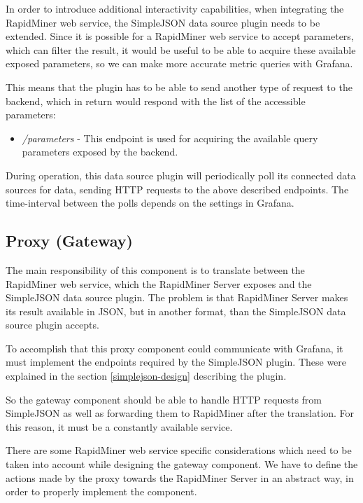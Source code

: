 In order to introduce additional interactivity capabilities, when integrating the RapidMiner web service, the SimpleJSON data source plugin needs to be extended. Since it is possible for a RapidMiner web service to accept parameters, which can filter the result, it would be useful to be able to acquire these available exposed parameters, so we can make more accurate metric queries with Grafana.

This means that the plugin has to be able to send another type of request to the backend, which in return would respond with the list of the accessible parameters:

\begin{itemize}
	\item \emph{/parameters} - This endpoint is used for acquiring the available query parameters exposed by the backend.
\end{itemize}

During operation, this data source plugin will periodically poll its connected data sources for data, sending HTTP requests to the above described endpoints. The time-interval between the polls depends on the settings in Grafana.

\subsection{Proxy (Gateway)} \label{proxy-design}

The main responsibility of this component is to translate between the RapidMiner web service, which the RapidMiner Server exposes and the SimpleJSON data source plugin. The problem is that RapidMiner Server makes its result available in JSON, but in another format, than the SimpleJSON data source plugin accepts.

To accomplish that this proxy component could communicate with Grafana, it must implement the endpoints required by the SimpleJSON plugin. These were explained in the section \ref{simplejson-design} describing the plugin.

So the gateway component should be able to handle HTTP requests from SimpleJSON as well as forwarding them to RapidMiner after the translation. For this reason, it must be a constantly available service.

There are some RapidMiner web service specific considerations which need to be taken into account while designing the gateway component. We have to define the actions made by the proxy towards the RapidMiner Server in an abstract way, in order to properly implement the component.

